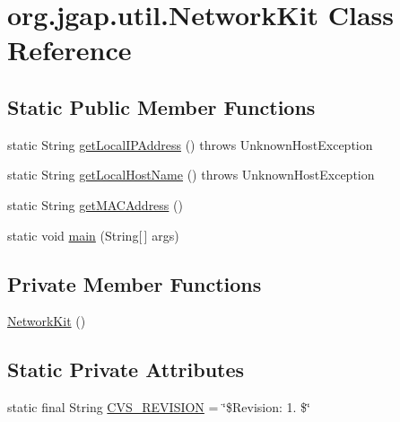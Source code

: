 \hypertarget{classorg_1_1jgap_1_1util_1_1_network_kit}{\section{org.\-jgap.\-util.\-Network\-Kit Class Reference}
\label{classorg_1_1jgap_1_1util_1_1_network_kit}
}
\subsection*{Static Public Member Functions}
\begin{DoxyCompactItemize}
\item 
static String \hyperlink{classorg_1_1jgap_1_1util_1_1_network_kit_abb3e74065c4f7171ca3a3c7bedcfd52c}{get\-Local\-I\-P\-Address} ()  throws Unknown\-Host\-Exception 
\item 
static String \hyperlink{classorg_1_1jgap_1_1util_1_1_network_kit_a373d1740b967d320519fadd501837dbf}{get\-Local\-Host\-Name} ()  throws Unknown\-Host\-Exception 
\item 
static String \hyperlink{classorg_1_1jgap_1_1util_1_1_network_kit_af9ae8f2e6957d7ed996002243f16f142}{get\-M\-A\-C\-Address} ()
\item 
static void \hyperlink{classorg_1_1jgap_1_1util_1_1_network_kit_a69584c2c160ccbd9f270e2057619a33e}{main} (String\mbox{[}$\,$\mbox{]} args)
\end{DoxyCompactItemize}
\subsection*{Private Member Functions}
\begin{DoxyCompactItemize}
\item 
\hyperlink{classorg_1_1jgap_1_1util_1_1_network_kit_a6bff5a2f5657d08952e43bfe30046672}{Network\-Kit} ()
\end{DoxyCompactItemize}
\subsection*{Static Private Attributes}
\begin{DoxyCompactItemize}
\item 
static final String \hyperlink{classorg_1_1jgap_1_1util_1_1_network_kit_a63603ce63892431fbdb574c24165b73e}{C\-V\-S\-\_\-\-R\-E\-V\-I\-S\-I\-O\-N} = \char`\"{}\$Revision\-: 1. \$\char`\"{}
\end{DoxyCompactItemize}


